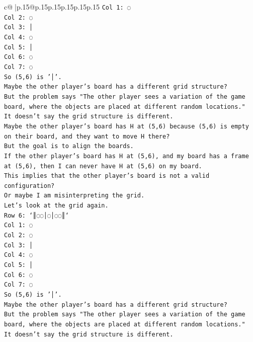 \documentclass{article}
\begin{document}
{\begin{supertabular}{c@{$\;$}|p{.15\linewidth}@{}p{.15\linewidth}p{.15\linewidth}p{.15\linewidth}p{.15\linewidth}p{.15\linewidth}}
{{{\texttt{Col 1: ◌} \\
\texttt{Col 2: ◌} \\
\texttt{Col 3: │} \\
\texttt{Col 4: ◌} \\
\texttt{Col 5: │} \\
\texttt{Col 6: ◌} \\
\texttt{Col 7: ◌} \\
\texttt{So (5,6) is '│'.} \\
\texttt{Maybe the other player's board has a different grid structure?} \\
\texttt{But the problem says "The other player sees a variation of the game board, where the objects are placed at different random locations."} \\
\texttt{It doesn't say the grid structure is different.} \\
\texttt{Maybe the other player's board has H at (5,6) because (5,6) is empty on their board, and they want to move H there?} \\
\texttt{But the goal is to align the boards.} \\
\texttt{If the other player's board has H at (5,6), and my board has a frame at (5,6), then I can never have H at (5,6) on my board.} \\
\texttt{This implies that the other player's board is not a valid configuration?} \\
\texttt{Or maybe I am misinterpreting the grid.} \\
\texttt{Let's look at the grid again.} \\
\texttt{Row 6: `║◌◌│◌│◌◌║`} \\
\texttt{Col 1: ◌} \\
\texttt{Col 2: ◌} \\
\texttt{Col 3: │} \\
\texttt{Col 4: ◌} \\
\texttt{Col 5: │} \\
\texttt{Col 6: ◌} \\
\texttt{Col 7: ◌} \\
\texttt{So (5,6) is '│'.} \\
\texttt{Maybe the other player's board has a different grid structure?} \\
\texttt{But the problem says "The other player sees a variation of the game board, where the objects are placed at different random locations."} \\
\texttt{It doesn't say the grid structure is different.} \\
}}}
\end{supertabular}}
\end{document}

